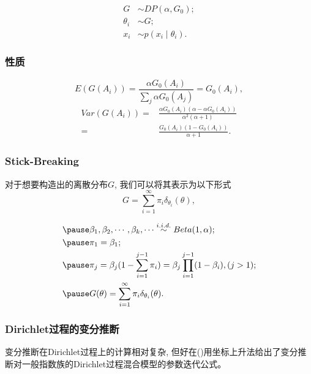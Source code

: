 \documentclass[10pt]{beamer}
\begin{document}
{\begin{frame}[c]
    \begin{align*}
        G & \sim DP\left(\alpha, G_{0}\right); \\
        \theta_{i} & \sim G; \\
        x_{i} & \sim p\left(x_{i} \mid \theta_{i}\right). 
    \end{align*}
\end{frame}

\begin{frame}[c]
    \frametitle{性质}
    \[E(G(A_i))=\frac{\alpha G_0(A_i)}{\sum_j \alpha G_0(A_j)}=G_0(A_i), \]
    \begin{align*}
        Var(G(A_i))=&\frac{\alpha G_0(A_i)\left(\alpha-\alpha G_0(A_i) \right)}{\alpha^2(\alpha+1)}\\=&\frac{G_0(A_i)(1-G_0(A_i))}{\alpha+1}. 
    \end{align*}
\end{frame}

\begin{frame}[c]
    \frametitle{Stick-Breaking}
    对于想要构造出的离散分布$G$, 我们可以将其表示为以下形式
    \begin{equation}
        G=\sum_{i=1}^{\infty}\pi_{i}\delta_{\theta_i}(\theta), 
    \end{equation}

    \begin{equation}
        \begin{aligned}
            \pause 
            &\beta_1, \beta_2, \cdots, \beta_k, \cdots \overset{i.i.d.}\sim Beta(1,\alpha); \\
            \pause 
            &\pi_1=\beta_1; \\
            \pause 
            &\pi_j=\beta_j(1-\sum_{i=1}^{j-1} \pi_i)=\beta_j\prod_{i=1}^{j-1}(1-\beta_i), (j>1); \\
            \pause 
            &G(\theta)=\sum_{i=1}^{\infty}\pi_i\delta_{\theta_i}(\theta). 
        \end{aligned}
    \end{equation}
\end{frame}

\begin{frame}[c]
    \frametitle{Dirichlet过程的变分推断}
    变分推断在Dirichlet过程上的计算相对复杂, 但好在\citeauthor{Blei2006}(\citeyear{Blei2006})用坐标上升法给出了变分推断对一般指数族的Dirichlet过程混合模型的参数迭代公式。
    

\end{frame}}
\end{document}
